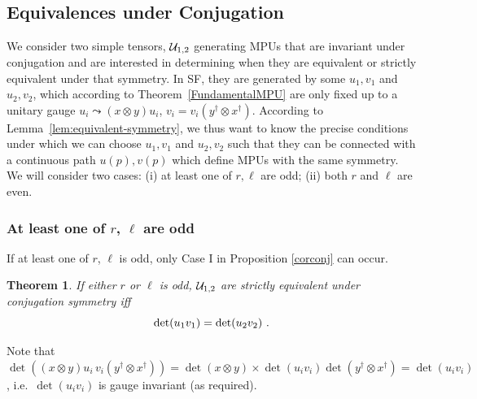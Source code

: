 \documentclass[pra,twocolumn,nofootinbib,superscriptaddress]{revtex4-1}
\newtheorem{thm}{Theorem}[section]
\begin{document}
\subsection{Equivalences under Conjugation}

We consider two simple tensors, ${\cal U}_{1,2}$ generating MPUs that are
invariant under conjugation and are interested in determining when they
are equivalent or strictly equivalent under that symmetry. In SF, they are
generated by some $u_1,v_1$ and $u_2,v_2$, which according to
Theorem~\ref{FundamentalMPU} are only fixed up to a unitary gauge
$u_i\leadsto (x\otimes y)u_i$, $v_i=v_i(y^\dagger\otimes x^\dagger)$.
According to Lemma~\ref{lem:equivalent-symmetry}, we thus want to know the
precise conditions under which we can choose $u_1,v_1$ and $u_2,v_2$ such
that they can be connected with a continuous path $u(p),v(p)$ which define
MPUs with the same symmetry.  We will consider two cases: (i) at least one
of $r,\ell$ are odd; (ii) both $r$ and $\ell$ are even.

\subsubsection{At least one of $r$, $\ell$ are odd}

If at least one of $r$, $\ell$ is odd, only Case I in Proposition
\ref{corconj} can occur.

\begin{thm}
	\label{conjphs}
	If either $r$ or $\ell$ is odd,
	${\cal U}_{1,2}$ are strictly equivalent under conjugation symmetry iff
	\[
		{\rm det}(u_1v_1)={\rm det}(u_2v_2)\ .
	\]
\end{thm}
\noindent
Note that
$\det((x\otimes y)u_i\, v_i(y^\dagger\otimes x^\dagger)) =
	\det(x\otimes y)\times\det(u_i v_i)\det(y^\dagger\otimes x^\dagger) =
	\det(u_iv_i)$, i.e.\ $\det(u_iv_i)$ is gauge invariant (as required).
\end{document}
